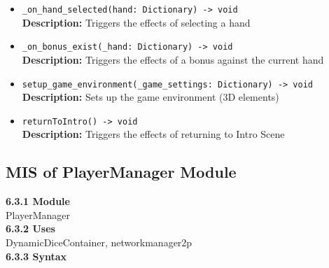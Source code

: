 \documentclass[12pt, titlepage]{article}
\begin{document}
\begin{itemize}
    \item \texttt{\_on\_hand\_selected(hand: Dictionary) -> void}\\
    \textbf{Description:} Triggers the effects of selecting a hand
    
    \item \texttt{\_on\_bonus\_exist(\_hand: Dictionary) -> void}\\
    \textbf{Description:} Triggers the effects of a bonus against the current hand
    
    \item \texttt{setup\_game\_environment(\_game\_settings: Dictionary) -> void}\\
    \textbf{Description:} Sets up the game environment (3D elements)
    
    \item \texttt{returnToIntro() -> void}\\
    \textbf{Description:} Triggers the effects of returning to Intro Scene
\end{itemize}

\subsection{MIS of PlayerManager Module}
\textbf{6.3.1 Module}\\
 PlayerManager\\

\noindent \textbf{6.3.2 Uses}\\
DynamicDiceContainer,  networkmanager2p\\

\noindent \textbf{6.3.3 Syntax}
\end{document}
